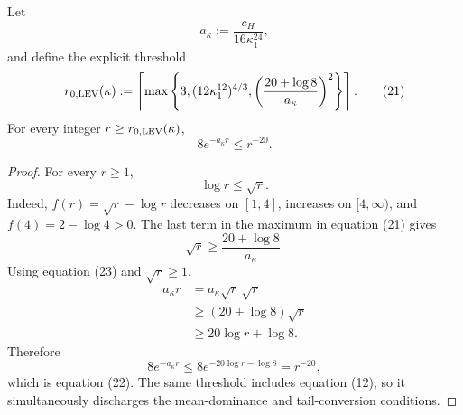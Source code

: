 \begin{lemma}
\label{lem:step-008-tail-conversion}
Let
\[
  a_\kappa:=\frac{c_H}{16\kappa_1^{24}},                   \tag{20}
\]
and define the explicit threshold
\[
  r_{0,\rm LEV}(\kappa)
  :=\left\lceil
    \max\left\{
      3,
      (12\kappa_1^{12})^{4/3},
      \left(\frac{20+\log8}{a_\kappa}\right)^2
    \right\}
  \right\rceil.                                            \tag{21}
\]
For every integer \(r\ge r_{0,\rm LEV}(\kappa)\),
\[
  8e^{-a_\kappa r}\le r^{-20}.                             \tag{22}
\]

\end{lemma}

\begin{proof}
For every \(r\ge1\),
\[
  \log r\le\sqrt r.                                       \tag{23}
\]
Indeed, \(f(r)=\sqrt r-\log r\) decreases on \([1,4]\), increases on
\([4,\infty)\), and \(f(4)=2-\log4>0\). The last term in the maximum in
equation (21) gives
\[
  \sqrt r\ge\frac{20+\log8}{a_\kappa}.
\]
Using equation (23) and \(\sqrt r\ge1\),
\[
\begin{aligned}
  a_\kappa r
  &=a_\kappa\sqrt r\,\sqrt r\\
  &\ge(20+\log8)\sqrt r\\
  &\ge20\log r+\log8.
\end{aligned}\tag{24}
\]
Therefore
\[
  8e^{-a_\kappa r}
  \le8e^{-20\log r-\log8}
  =r^{-20},
\]
which is equation (22). The same threshold includes equation (12), so it
simultaneously discharges the mean-dominance and tail-conversion conditions.


\end{proof}

